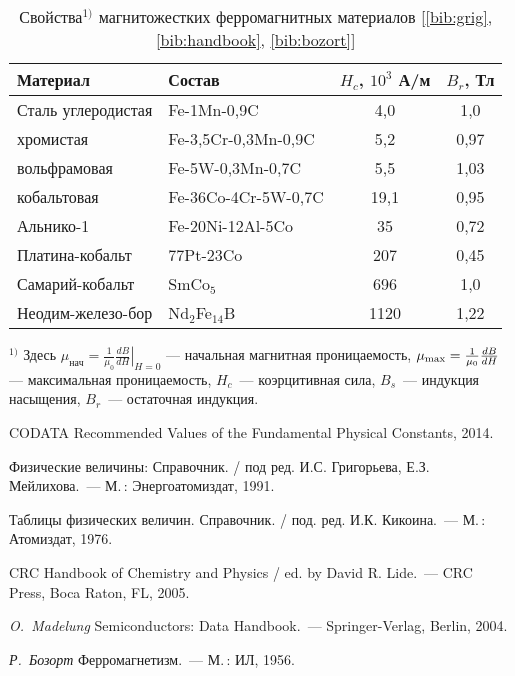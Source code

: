 \begin{labsupplement}
\begin{table}
\caption{Свойства$^{1)}$ магнитожестких ферромагнитных материалов
[\ref{bib:grig}, \ref{bib:handbook}, \ref{bib:bozort}]}
\centering\small
 \begin{tabular}{p{3.2cm}lcc}
 \toprule[1pt]
Материал & Состав & $H_c$, $10^3$ А/м & $B_r$, Тл \\
\midrule[1pt]
Сталь углеродистая & Fe-1Mn-0,9C & 4,0 & 1,0 \\
\quad хромистая & Fe-3,5Cr-0,3Mn-0,9C & 5,2 & 0,97 \\
\quad вольфрамовая & Fe-5W-0,3Mn-0,7C & 5,5 & 1,03 \\
\quad кобальтовая & Fe-36Co-4Cr-5W-0,7C & 19,1 & 0,95 \\
Альнико-1 & Fe-20Ni-12Al-5Co & 35 & 0,72 \\
Платина-кобальт & 77Pt-23Co & 207 & 0,45 \\
Самарий-кобальт & SmCo$_5$ & 696 & 1,0 \\
Неодим-железо-бор & Nd$_2$Fe$_{14}$B & 1120 & 1,22 \\
\bottomrule
 \end{tabular}\par
\bigskip
\raggedright\noindent
$^{1)}$ Здесь $\mu_{нач}=\frac{1}{\mu_0}\left.\frac{dB}{dH}\right|_{H=0}$ --- начальная
магнитная проницаемость,
$\mu_{\rm max}=\frac{1}{\mu_0}\frac{dB}{dH}$ --- максимальная
проницаемость, $H_c$~--- коэрцитивная сила, $B_s$~--- индукция насыщения,
$B_r$~--- остаточная индукция.
\end{table}




\clearpage

\begin{lab:literature}
 \item \label{bib:codata} CODATA Recommended Values of the Fundamental Physical Constants, 2014.
 \item \label{bib:grig} Физические величины: Справочник. /
    под ред. И.С. Григорьева, Е.З. Мейлихова.~--- М.\,: Энергоатомиздат, 1991.
 \item \label{bib:kikoin} Таблицы физических величин. Справочник. /
    под. ред. И.К. Кикоина.~--- М.\,: Атомиздат, 1976.
 \item \label{bib:handbook} CRC Handbook of Chemistry and Physics / ed. by David R. Lide.~---
 CRC Press, Boca Raton, FL, 2005.
 \item \label{bib:semi} \textit{O.~Madelung} Semiconductors: Data Handbook.~---
 Springer-Verlag, Berlin, 2004.
 \item \label{bib:bozort} \textit{Р.~Бозорт} Ферромагнетизм.~--- М.\,: ИЛ, 1956.

\end{lab:literature}

\end{labsupplement}
